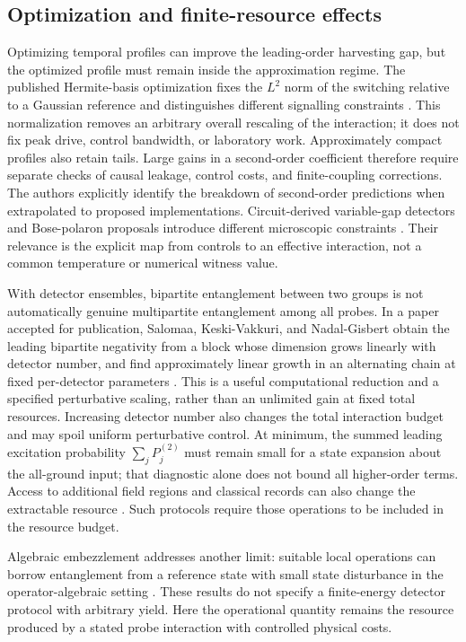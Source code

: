 \documentclass[pdflatex,sn-mathphys-num]{sn-jnl}
\begin{document}
\subsection{Optimization and finite-resource effects}
Optimizing temporal profiles can improve the leading-order harvesting gap, but the optimized profile must remain inside the approximation regime. The published Hermite-basis optimization fixes the $L^2$ norm of the switching relative to a Gaussian reference and distinguishes different signalling constraints \cite{MoroteBalboaPerche2026}. This normalization removes an arbitrary overall rescaling of the interaction; it does not fix peak drive, control bandwidth, or laboratory work. Approximately compact profiles also retain tails. Large gains in a second-order coefficient therefore require separate checks of causal leakage, control costs, and finite-coupling corrections. The authors explicitly identify the breakdown of second-order predictions when extrapolated to proposed implementations. Circuit-derived variable-gap detectors and Bose-polaron proposals introduce different microscopic constraints \cite{TeixidoBonfill2026,PercheGozzini2026}. Their relevance is the explicit map from controls to an effective interaction, not a common temperature or numerical witness value.

With detector ensembles, bipartite entanglement between two groups is not automatically genuine multipartite entanglement among all probes. In a paper accepted for publication, Salomaa, Keski-Vakkuri, and Nadal-Gisbert obtain the leading bipartite negativity from a block whose dimension grows linearly with detector number, and find approximately linear growth in an alternating chain at fixed per-detector parameters \cite{SalomaaKeskiVakkuriNadalGisbert2026}. This is a useful computational reduction and a specified perturbative scaling, rather than an unlimited gain at fixed total resources. Increasing detector number also changes the total interaction budget and may spoil uniform perturbative control. At minimum, the summed leading excitation probability $\sum_j P_j^{(2)}$ must remain small for a state expansion about the all-ground input; that diagnostic alone does not bound all higher-order terms. Access to additional field regions and classical records can also change the extractable resource \cite{KlcoBeck2023}. Such protocols require those operations to be included in the resource budget.

Algebraic embezzlement addresses another limit: suitable local operations can borrow entanglement from a reference state with small state disturbance in the operator-algebraic setting \cite{vanLuijk2024,vanLuijk2025}. These results do not specify a finite-energy detector protocol with arbitrary yield. Here the operational quantity remains the resource produced by a stated probe interaction with controlled physical costs.
\end{document}
